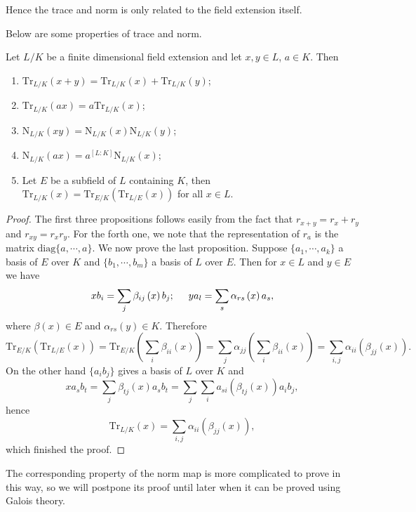 Hence the trace and norm is only related to the field extension itself.\par
Below are some properties of trace and norm.
\begin{proposition}
Let $L/K$ be a finite dimensional field extension and let $x,y\in L$, $a\in K$. Then 
\begin{enumerate}
    \item $\mathrm{Tr}_{L/K}\left( x+y \right) =\mathrm{Tr}_{L/K}\left( x \right) +\mathrm{Tr}_{L/K}\left( y \right) $;
    \item $\mathrm{Tr}_{L/K}\left( ax \right) =a\mathrm{Tr}_{L/K}\left( x \right) $;
    \item $\mathrm{N}_{L/K}\left( xy \right) =\mathrm{N}_{L/K}\left( x \right) \mathrm{N}_{L/K}\left( y \right) $;
    \item $\mathrm{N}_{L/K}\left( ax \right) =a^{\left[ L:K \right]}\mathrm{N}_{L/K}\left( x \right) $;
    \item Let $E$ be a subfield of $L$ containing $K$, then $\mathrm{Tr}_{L/K}(x)=\mathrm{Tr}_{E/K}(\mathrm{Tr}_{L/E}(x))$ for all $x\in L$.
\end{enumerate}
\end{proposition}
\begin{proof}
The first three propositions follows easily from the fact that $r_{x+y}=r_x+r_y$ and $r_{xy}=r_xr_y$. For the forth one, we note that the representation of $r_a$ is the matrix $\mathrm{diag}\{a,\cdots,a\}$. We now prove the last proposition. Suppose $\{a_1,\cdots,a_k\}$ a basis of $E$ over $K$ and $\{b_1,\cdots,b_m\}$ a basis of $L$ over $E$. Then for $x\in L$ and $y\in E$ we have 
$$
xb_i=\sum_j{\beta _{ij}\left( x \right) b_j};\hspace{0.5cm}ya_l=\sum_s{\alpha _{rs}\left( x \right) a_s},
$$
where $\beta(x)\in E$ and $\alpha_{rs}(y)\in K$. Therefore 
$$
\mathrm{Tr}_{E/K}\left( \mathrm{Tr}_{L/E}\left( x \right) \right) =\mathrm{Tr}_{E/K}\left( \sum_i{\beta _{ii}\left( x \right)} \right) =\sum_j{\alpha _{jj}\left( \sum_i{\beta _{ii}\left( x \right)} \right)}=\sum_{i,j}{\alpha _{ii}\left( \beta _{jj}\left( x \right) \right)}.
$$
On the other hand $\{a_ib_j\}$ gives a basis of $L$ over $K$ and 
$$
xa_sb_t=\sum_j{\beta _{tj}\left( x \right) a_sb_t}=\sum_j{\sum_i{a_{si}\left( \beta _{tj}\left( x \right) \right) a_ib_j}},
$$
hence 
$$
\mathrm{Tr}_{L/K}\left( x \right) =\sum_{i,j}{\alpha _{ii}\left( \beta _{jj}\left( x \right) \right)},
$$
which finished the proof.
\end{proof}
The corresponding property of the norm map is more complicated to prove in this way, so we will postpone its proof until later when it can be proved using Galois theory.\par

